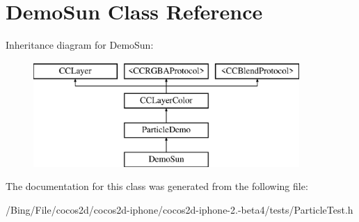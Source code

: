 \hypertarget{interface_demo_sun}{\section{Demo\-Sun Class Reference}
\label{interface_demo_sun}
}
Inheritance diagram for Demo\-Sun\-:\begin{figure}[H]
\begin{center}
\leavevmode
\includegraphics[height=4.000000cm]{interface_demo_sun}
\end{center}
\end{figure}


The documentation for this class was generated from the following file\-:\begin{DoxyCompactItemize}
\item 
/\-Bing/\-File/cocos2d/cocos2d-\/iphone/cocos2d-\/iphone-\/2.-\/beta4/tests/Particle\-Test.\-h\end{DoxyCompactItemize}
